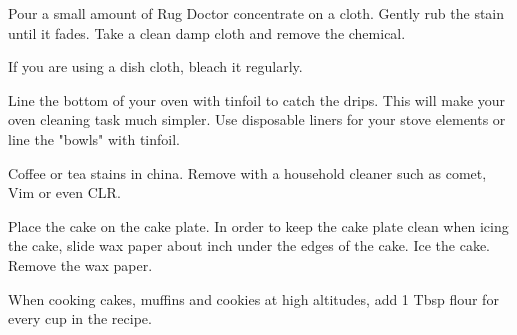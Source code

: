  \par
\begin{minipage}{\linewidth}
Pour a small amount of Rug Doctor concentrate on a cloth. Gently rub the stain until it fades. Take a clean damp cloth and remove the chemical.
\end{minipage}\par

\begin{minipage}{\linewidth}
\end{minipage}\par

\begin{minipage}{\linewidth}
If you are using a dish cloth, bleach it regularly.
\end{minipage}\par

\begin{minipage}{\linewidth}
Line the bottom of your oven with tinfoil to catch the drips. This will make your oven cleaning task much simpler.
Use disposable liners for your stove elements or line the "bowls" with tinfoil.
\end{minipage}\par

\begin{minipage}{\linewidth}
Coffee or tea stains in china. Remove with a household cleaner such as comet, Vim or even CLR.
\end{minipage}\par

 \par
\begin{minipage}{\linewidth}
Place the cake on the cake plate. In order to keep the cake plate clean when icing the cake, slide wax paper about  inch under the edges of the cake. Ice the cake. Remove the wax paper.
\end{minipage}\par

\begin{minipage}{\linewidth}
When cooking cakes, muffins and cookies at high altitudes, add 1 Tbsp flour for every cup in the recipe.
\end{minipage}\par

